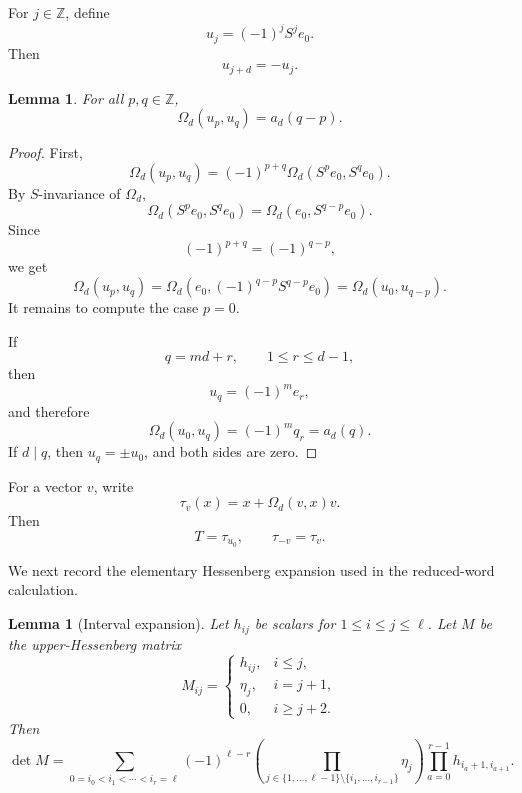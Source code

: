 \documentclass[a4paper,11pt]{amsart}
\newcommand{\Z}{\mathbb Z}
\newtheorem{lemma}[theorem]{Lemma}
\theoremstyle{remark}
\numberwithin{equation}{section}
\begin{document}
For \(j\in\Z\), define
\begin{equation}\label{eq:u_j}
u_j=(-1)^jS^je_0.
\end{equation}
Then
\[
u_{j+d}=-u_j.
\]

\begin{lemma}\label{lem:pairing}
For all \(p,q\in\Z\),
\begin{equation}\label{eq:pairing}
\Omega_d(u_p,u_q)=a_d(q-p).
\end{equation}
\end{lemma}

\begin{proof}
First,
\[
\Omega_d(u_p,u_q)
=
(-1)^{p+q}\Omega_d(S^pe_0,S^qe_0).
\]
By \(S\)-invariance of \(\Omega_d\),
\[
\Omega_d(S^pe_0,S^qe_0)
=
\Omega_d(e_0,S^{q-p}e_0).
\]
Since
\[
(-1)^{p+q}=(-1)^{q-p},
\]
we get
\[
\Omega_d(u_p,u_q)
=
\Omega_d(e_0,(-1)^{q-p}S^{q-p}e_0)
=
\Omega_d(u_0,u_{q-p}).
\]
It remains to compute the case \(p=0\).

If
\[
q=md+r,
\qquad
1\leq r\leq d-1,
\]
then
\[
u_q=(-1)^me_r,
\]
and therefore
\[
\Omega_d(u_0,u_q)=(-1)^mq_r=a_d(q).
\]
If \(d\mid q\), then \(u_q=\pm u_0\), and both sides are zero.
\end{proof}

For a vector \(v\), write
\[
\tau_v(x)=x+\Omega_d(v,x)v.
\]
Then
\[
T=\tau_{u_0},
\qquad
\tau_{-v}=\tau_v.
\]

We next record the elementary Hessenberg expansion used in the reduced-word calculation.

\begin{lemma}[Interval expansion]\label{lem:interval-expansion}
Let \(h_{ij}\) be scalars for \(1\leq i\leq j\leq\ell\). Let \(M\) be the upper-Hessenberg matrix
\[
M_{ij}
=
\begin{cases}
h_{ij},&i\leq j,\\
\eta_j,&i=j+1,\\
0,&i\geq j+2.
\end{cases}
\]
Then
\begin{equation}\label{eq:interval-expansion}
\det M
=
\sum_{0=i_0<i_1<\cdots<i_r=\ell}
(-1)^{\ell-r}
\left(
\prod_{j\in\{1,\ldots,\ell-1\}\setminus\{i_1,\ldots,i_{r-1}\}}\eta_j
\right)
\prod_{a=0}^{r-1}
h_{i_a+1,i_{a+1}}.
\end{equation}
\end{lemma}
\end{document}
